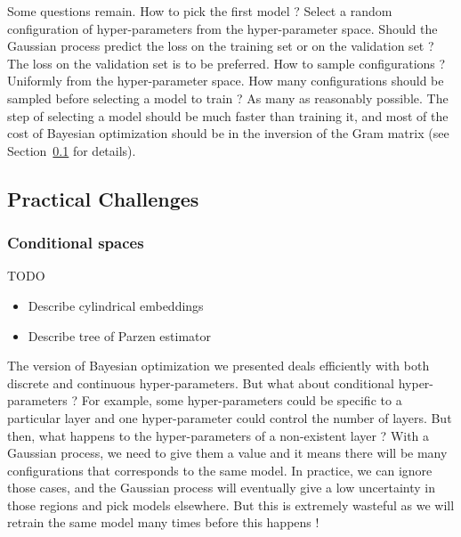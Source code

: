Some questions remain. How to pick the first model ? Select a random configuration of hyper-parameters from the hyper-parameter space. Should the Gaussian process predict the loss on the training set or on the validation set ? The loss on the validation set is to be preferred. How to sample configurations ? Uniformly from the hyper-parameter space. How many configurations should be sampled before selecting a model to train ? As many as reasonably possible. The step of selecting a model should be much faster than training it, and most of the cost of Bayesian optimization should be in the inversion of the Gram matrix (see Section~\ref{ssec:practical} for details).



\subsection{Practical Challenges}
\label{ssec:practical}


\subsubsection{Conditional spaces}

TODO
\begin{itemize}
    \item Describe cylindrical embeddings
    \item Describe tree of Parzen estimator
\end{itemize}

The version of Bayesian optimization we presented deals efficiently with both discrete and continuous hyper-parameters. But what about conditional hyper-parameters ? For example, some hyper-parameters could be specific to a particular layer and one hyper-parameter could control the number of layers. But then, what happens to the hyper-parameters of a non-existent layer ? With a Gaussian process, we need to give them a value and it means there will be many configurations that corresponds to the same model. In practice, we can ignore those cases, and the Gaussian process will eventually give a low uncertainty in those regions and pick models elsewhere. But this is extremely wasteful as we will retrain the same model many times before this happens ! 

